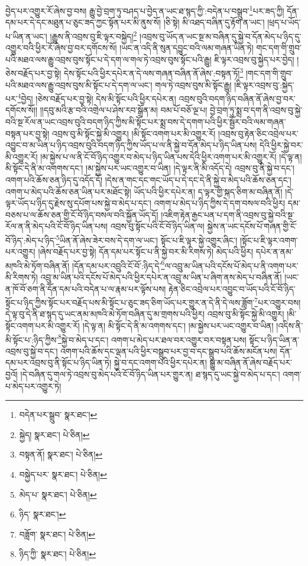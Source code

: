 བྱེད་པར་འགྱུར་རོ་ཞེས་བྱ་བས། རྒྱུ་བྱེ་བྲག་ཏུ་བཤད་པ་བྱེད་ན་ཡང་ཐ་སྙད་ཀྱི་:བདེན་པ་བསྒྲུབ་\footnote{བདེན་པར་སྒྲུབ་  སྣར་ཐང་། }པར་ཟད་ཀྱི། དོན་དམ་པར་དེ་དང་མཐུན་པ་ཅུང་ཟད་ཀྱང་སྟོན་པར་མི་ནུས་སོ། །ཅི་སྟེ། མི་འཐད་བཞིན་དུ་རྟོག་ན་ཡང་། །ཕྲད་པ་ཡོད་པ་ཡིན་ན་ཡང་། །རྒྱུས་ནི་འབྲས་བུ་ཇི་ལྟར་བསྐྱེད།\footnote{སྐྱེད།  སྣར་ཐང་།  པེ་ཅིན། } །འབྲས་བུ་ཡོད་ན་ཡང་སྔ་མ་བཞིན་དུ་སྐྱེ་བ་དོན་མེད་པ་ཉིད་དུ་འགྱུར་བའི་ཕྱིར་རོ་ཞེས་བྱ་བར་དགོངས་སོ། །ཡང་ན་འདི་ནི་སུན་དབྱུང་བའི་ལམ་གཞན་ཡིན་ཏེ། གང་དག་གི་གྲུབ་པའི་མཐའ་ལས་རྒྱུ་འབྲས་བུས་སྟོང་པ་དེ་དག་ལ་གལ་ཏེ་འབྲས་བུས་སྟོང་པའི་རྒྱུ། ཇི་ལྟར་འབྲས་བུ་སྐྱེད་པར་བྱེད། །ཅེས་བརྗོད་པར་བྱ་སྟེ། དེས་སྟོང་པའི་ཕྱིར་དཔེར་ན་དེ་ལས་གཞན་བཞིན་ནོ་ཞེས་:བསྟན་ཏོ།\footnote{བསྟན་ནོ།  སྣར་ཐང་།  པེ་ཅིན། } །གང་དག་གི་གྲུབ་པའི་མཐའ་ལས་རྒྱུ་འབྲས་བུས་མི་སྟོང་པ་དེ་དག་ལ་ཡང་། གལ་ཏེ་འབྲས་བུས་མི་སྟོང་རྒྱུ། །ཇི་ལྟར་འབྲས་བུ་:སྐྱེད་པར་\footnote{བསྐྱེད་པར་  སྣར་ཐང་།  པེ་ཅིན། }བྱེད། །ཅེས་བརྗོད་པར་བྱ་སྟེ། དེས་མི་སྟོང་པའི་ཕྱིར་དཔེར་ན། འབྲས་བུའི་བདག་ཉིད་བཞིན་ནོ་ཞེས་བྱ་བར་དགོངས་སོ།། །།དབུ་མའི་རྩ་བའི་འགྲེལ་པ་ཤེས་རབ་སྒྲོན་མ། བམ་པོ་བཅོ་ལྔ་པ། བྱེ་བྲག་ཏུ་སྨྲ་བ་དག་ནི་འབྲས་བུ་སྐྱེ་བའི་སྔ་རོལ་ན་ཡང་འབྲས་བུའི་བདག་ཉིད་ཀྱིས་མི་སྟོང་པར་སྨྲ་བས་དེ་དགག་པའི་ཕྱིར་སྦྱོར་བའི་ལམ་གཞན་བསྟན་པར་བྱ་སྟེ། འབྲས་བུ་མི་སྟོང་སྐྱེ་མི་འགྱུར། །མི་སྟོང་འགག་པར་མི་འགྱུར་རོ། །འབྲས་བུ་རྟེན་ཅིང་འབྲེལ་པར་འབྱུང་བ་མ་ཡིན་པ་ཉིད་འབྲས་བུའི་བདག་ཉིད་ཀྱིས་ཡོད་པ་ལ་ནི་སྐྱེ་བ་དོན་མེད་པ་ཉིད་ཡིན་པས། དེའི་ཕྱིར་སྐྱེ་བར་མི་འགྱུར་རོ། །མ་སྐྱེས་པ་ལ་ནི་ངོ་བོ་ཉིད་འགྱུར་བ་མེད་པ་ཉིད་ཡིན་པས་དེའི་ཕྱིར་འགག་པར་མི་འགྱུར་རོ། །དེ་ལྟ་ན། མི་སྟོང་དེ་ནི་མ་འགགས་དང་། །མ་སྐྱེས་པར་ཡང་འགྱུར་བ་ཡིན། །དེ་ལྟར་ནི་མི་འདོད་དེ། འབྲས་བུ་ནི་སྐྱེ་བ་དང་། འགག་པའི་ཆོས་ཅན་ཉིད་དུ་འདོད་དོ། །དེས་ན་གང་དང་གང་ཡོད་པ་དེ་དང་དེ་ནི་སྐྱེ་བ་མེད་པའི་ཆོས་ཅན་དང་། འགག་པ་མེད་པའི་ཆོས་ཅན་ཡིན་པར་མཐོང་སྟེ། ཡོད་པའི་ཕྱིར་དཔེར་ན། ད་ལྟར་གྱི་སྐད་ཅིག་མ་བཞིན་ནོ། །དེ་ལྟར་ཡོད་པ་ཉིད་དུ་རྗེས་སུ་དཔོག་པས་སྐྱེ་བ་མེད་པ་དང་། འགག་པ་མེད་པ་ཉིད་ཀྱིས་དེ་དག་བསལ་བའི་ཕྱིར། དམ་བཅས་པ་ལ་ཆོས་ཅན་གྱི་ངོ་བོ་ཉིད་བསལ་བའི་སྐྱོན་ཡོད་དོ། །འཇིག་རྟེན་རྒྱང་པན་པ་དག་ནི་འབྲས་བུ་སྐྱེ་བའི་སྔ་རོལ་ན་ནི་མེད་པའི་ངོ་བོ་ཉིད་ཡིན་པས། འབྲས་བུ་སྟོང་པའི་ངོ་བོ་ཉིད་ཡིན་ལ། སྐྱེས་ན་ཡང་དངོས་པོ་གཞན་གྱི་ངོ་བོ་ཉིད་:མེད་པ་ཉིད་\footnote{མེད་པ་  སྣར་ཐང་།  པེ་ཅིན། }ཡིན་ནོ་ཞེས་ཟེར་བས་དེ་དག་ལ་ཡང་། སྟོང་པ་ཇི་ལྟར་སྐྱེ་འགྱུར་ཞིང་། །སྟོང་པ་ཇི་ལྟར་འགག་པར་འགྱུར། །ཞེས་བརྗོད་པར་བྱ་སྟེ། དོན་དམ་པར་སྟོང་པ་ནི་སྐྱེ་བར་མི་རིགས་ཏེ། མེད་པའི་ཕྱིར། དཔེར་ན་ནམ་མཁའི་མེ་ཏོག་བཞིན་ནོ། །དོན་དམ་པར་འབྲུའི་ངོ་བོ་:ཉིད་དེ་\footnote{ཉིད་  སྣར་ཐང་། }ལ་འབྲུ་མ་ཡིན་པའི་དངོས་པོ་མེད་པ་ནི་འགག་པར་མི་རིགས་ཏེ། འབྲུ་མ་ཡིན་པའི་དངོས་པོ་མེད་པའི་ཕྱིར་དཔེར་ན་འབྲུ་མ་ཡིན་པ་ཞིག་ནས་མེད་པ་བཞིན་ནོ། །ཡང་ན་ཁོ་བོ་ཅག་ནི་དོན་དམ་པའི་བདེན་པ་ལ་རྣམ་པར་ལྟོས་པས། རྟེན་ཅིང་འབྲེལ་པར་འབྱུང་བ་ཡོད་པའི་ངོ་བོ་ཉིད་སྟོང་པ་ཉིད་ཀྱིས་སྟོང་པར་བརྗོད་པས་མི་སྟོང་པ་ཅུང་ཟད་ཅིག་ཡོད་པར་གྱུར་ན་དེ་ནི་དེ་ལས་ཟློག་\footnote{བཟློག་  སྣར་ཐང་།  པེ་ཅིན། }པར་འགྱུར་བས། དེ་ལྟ་བུ་དེ་ནི་ཐ་སྙད་དུ་ཡང་ནམ་མཁའི་མེ་ཏོག་བཞིན་དུ་མ་གྲགས་པའི་ཕྱིར། འབྲས་བུ་མི་སྟོང་སྐྱེ་མི་འགྱུར། །མི་སྟོང་འགག་པར་མི་འགྱུར་རོ། །དེ་ལྟ་ན། མི་སྟོང་དེ་ནི་མ་འགགས་དང་། །མ་སྐྱེས་པར་ཡང་འགྱུར་བ་ཡིན། །འདིས་ནི་མི་སྟོང་པ་:ཉིད་ཀྱིས་\footnote{ཉིད་ཀྱི་  སྣར་ཐང་།  པེ་ཅིན། }སྐྱེ་བ་མེད་པ་དང་། འགག་པ་མེད་པར་ཐལ་བར་འགྱུར་བར་བསྟན་པས། སྟོང་པ་ཉིད་ཡིན་ན་འབྲས་བུ་སྐྱེ་བ་དང་། འགག་པའི་ཆོས་དང་ལྡན་པའི་ཕྱིར་བསྒྲུབ་པར་བྱ་བ་དང་སྒྲུབ་པའི་ཆོས་མངོན་པས། དོན་དམ་པར་འབྲས་བུ་ནི་སྟོང་པ་ཉིད་ཡིན་ཏེ། སྐྱེ་བ་དང་འགག་པའི་ཕྱིར་དཔེར་ན། སྒྱུ་མ་བཞིན་ནོ་ཞེས་བརྗོད་པར་བྱའོ། །དེ་བཞིན་དུ་གལ་ཏེ་འབྲས་བུ་མེད་པའི་ངོ་བོ་ཉིད་ཡིན་པར་གྱུར་ན། ཐ་སྙད་དུ་ཡང་སྐྱེ་བ་མེད་པ་དང་། འགག་པ་མེད་པར་འགྱུར་ཏེ། 
